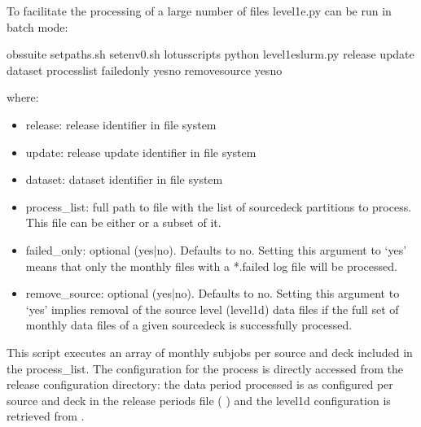 \documentclass[letterpaper,10pt,english]{sphinxmanual}
\begin{document}
To facilitate the processing of a large number of files level1e.py can be run
in batch mode:

\begin{sphinxVerbatim}[commandchars=\\\{\}]
 obs\PYGZhy{}suite
 setpaths.sh
 setenv0.sh
 lotus\PYGZus{}scripts
python level1e\PYGZus{}slurm.py release update dataset  process\PYGZus{}list \PYGZhy{}\PYGZhy{}failed\PYGZus{}only yesno \PYGZhy{}\PYGZhy{}remove\PYGZus{}source yesno
\end{sphinxVerbatim}

where:
\begin{itemize}
\item {}
release: release identifier in file system

\item {}
update: release update identifier in file system

\item {}
dataset: dataset identifier in file system

\item {}
process\_list: full path to file with the list of source\sphinxhyphen{}deck partitions to
process. This file can be either {\hyperref[\detokenize{index:process-list-file}]{}} or a subset of it.

\item {}
failed\_only: optional (yes|no). Defaults to no. Setting this argument to ‘yes’
means that only the monthly files with a *.failed log file will be processed.

\item {}
remove\_source: optional (yes|no). Defaults to no. Setting this argument to ‘yes’
implies removal of the source level (level1d) data files if the full set of
monthly data files of a given source\sphinxhyphen{}deck is successfully processed.

\end{itemize}

This script executes an array of monthly subjobs per source and deck included in
the process\_list. The configuration for the process is directly accessed from
the release configuration directory: the data period processed is as configured
per source and deck in the release periods file ( {\hyperref[\detokenize{index:release-periods-file}]{}})
and the level1d configuration is retrieved from {\hyperref[\detokenize{index:level1e-config-file}]{}}.
\end{document}
